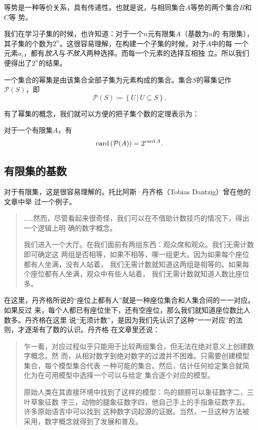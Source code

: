 等势是一种等价关系，具有传递性。也就是说，与相同集合$A$等势的两个集合$B$和$C$等
势。

我们在学习子集的时候，也许知道：对于一个$n$元有限集$A$（基数为$n$的
有限集），其子集的个数为$2^n$。这很容易理解，在构建一个子集的时候，对于$A$中的每
一个元素$a_i$，都有\emph{放入}与\emph{不放入}两种选择。而每一个元素的选择互相独
立。所以我们便得出了$2^n$的结果。

\begin{rawdef}[幂集]
    一个集合的幂集是由该集合全部子集为元素构成的集合。集合$S$的幂集记作
    $\mathcal{P}(S)$，即
    \[
        \mathcal{P}(S)\coloneqq \left\{ U \,|\, U \subseteq S \right\}.
    \]
\end{rawdef}

有了幂集的概念，我们就可以方便的把子集个数的定理表示为：
\begin{rawthm}
    对于一个有限集$A$，有
    \[
        \operatorname{card} \left( \mathcal{P}(A) \right) = 2^{\operatorname{card} A}.
    \]
\end{rawthm}


\subsection{有限集的基数}

对于有限集，这是很容易理解的。托比阿斯·丹齐格（Tobias Dantzig）曾在他的文章中举
过一个例子。\cite{dantzig2007number}

\begin{quotation}
    ……然而，尽管看起来很奇怪，我们可以在不借助计数技巧的情况下，得出一个逻辑上明
    确的数字概念。

    我们进入一个大厅。在我们面前有两组东西：观众席和观众。我们无需计数即可确定这
    两组是否相等，如果不相等，哪一组更大。因为如果每个座位都有人坐满，没有人站着，
    我们无需计数就知道这两组是相等的。如果每个座位都有人坐满，观众中有些人站着，
    我们无需计数就知道人数比座位多。
\end{quotation}

在这里，丹齐格所说的“座位上都有人”就是一种座位集合和人集合间的一一对应。如果反过
来，每个人都已有座位坐下，还有空座位，那么我们就知道座位数比人数多。丹齐格在这里
说“无须计数”，是因为我们先认识了这种“一一对应”的法则，才逐渐有了数的认识。丹齐格
在文章里还说：

\begin{quotation}
    乍一看，对应过程似乎只能用于比较两组集合，但无法在绝对意义上创建数字概念。然
    而，从相对数字到绝对数字的过渡并不困难。只需要创建模型集合，每个模型集合代表
    一种可能的集合。然后，估计任何给定集合就简化为在可用模型中选择一个可以与给定
    集合逐个对应的模型。

    原始人类在其直接环境中找到了这样的模型：鸟的翅膀可以象征数字二，三叶草象征数
    字三，动物的腿象征数字四，他自己手上的手指象征数字五。许多原始语言中可以找到
    这种数字词起源的证据。当然，一旦这种方法被采用，数字概念就得到了发展和普及。
\end{quotation}

